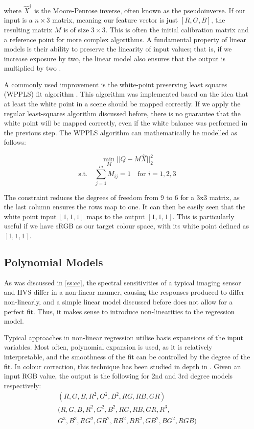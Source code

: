 where $\hat{X}^{\dag}$ is the Moore-Penrose inverse, often known as the pseudoinverse. If our input is a $n \times 3$ matrix, meaning our feature vector is just $[R, G, B]$, the resulting matrix $M$ is of size $3\times3$. This is often the initial calibration matrix and a reference point for more complex algorithms. A fundamental property of linear models is their ability to preserve the linearity of input values; that is, if we increase exposure by two, the linear model also ensures that the output is multiplied by two \cite{finlayson2015color}.

A commonly used improvement is the white-point preserving least squares (WPPLS) fit algorithm \cite{finlayson1997white}. This algorithm was implemented based on the idea that at least the white point in a scene should be mapped correctly. If we apply the regular least-squares algorithm discussed before, there is no guarantee that the white point will be mapped correctly, even if the white balance was performed in the previous step. The WPPLS algorithm can mathematically be modelled as follows:

\begin{equation}
\underset{M}{\min} ||Q - M \hat{X}||_2^2
\end{equation}
\begin{equation*}
\text{s.t.}\quad \sum_{j=1}^{m} M_{ij} = 1 \quad \text{for } i = 1, 2, 3
\end{equation*}

The constraint reduces the degrees of freedom from 9 to 6 for a 3x3 matrix, as the last column ensures the rows map to one. It can then be easily seen that the white point input $[1,1,1]$ maps to the output $[1,1,1]$. This is particularly useful if we have sRGB as our target colour space, with its white point defined as $[1,1,1]$.

\subsection{Polynomial Models}
\label{ss:polynomials}
As was discussed in \ref{ss:cc}, the spectral sensitivities of a typical imaging sensor and HVS differ in a non-linear manner, causing the responses produced to differ non-linearly, and a simple linear model discussed before does not allow for a perfect fit. Thus, it makes sense to introduce non-linearities to the regression model.

Typical approaches in non-linear regression utilise basis expansions of the input variables. Most often, polynomial expansion is used, as it is relatively interpretable, and the smoothness of the fit can be controlled by the degree of the fit. In colour correction, this technique has been studied in depth in \cite{hong2001study, finlayson2015color}. Given an input RGB value, the output is the following for 2nd and 3rd degree models respectively:
\begin{gather*}
    (R, G, B, R^2, G^2, B^2, RG, RB, GR) \\
    (R, G, B, R^2, G^2, B^2, RG, RB, GR, R^3,\\ G^3, B^3, RG^2, GR^2, RB^2, BR^2, GB^2, BG^2, RGB)
\end{gather*}

